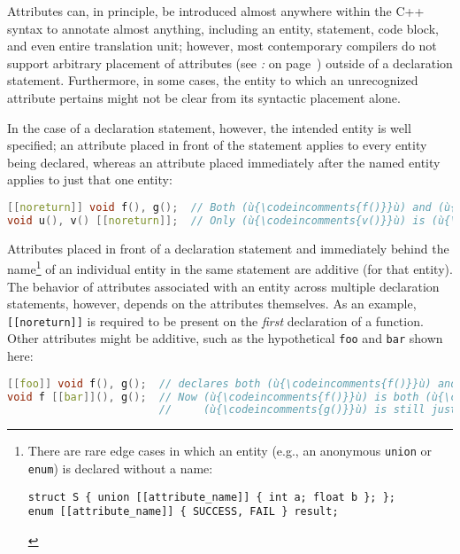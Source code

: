 Attributes can, in principle, be introduced almost anywhere within the
C++ syntax to annotate almost anything, including an entity,
statement, code block, and even entire translation
unit; however, most contemporary compilers do not support arbitrary
placement of attributes (see {\it{}:} {\it{}} on page~\pageref{probing-where-attributes-are-permitted-in-the-compiler’s-c++-grammar}) outside of a
declaration statement. Furthermore, in some cases, the entity to
which an unrecognized attribute pertains might not be clear from its
syntactic placement alone.

In the case of a declaration statement, however, the intended entity is
well specified; an attribute placed in front of the statement applies to
every entity being declared, whereas an attribute placed immediately
after the named entity applies to just that one entity:

\begin{lstlisting}[language=C++]
[[noreturn]] void f(), g();  // Both (ù{\codeincomments{f()}}ù) and (ù{\codeincomments{g()}}ù) are (ù{\codeincomments{noreturn}}ù).
void u(), v() [[noreturn]];  // Only (ù{\codeincomments{v()}}ù) is (ù{\codeincomments{noreturn}}ù).
\end{lstlisting}

\noindent Attributes placed in front of a declaration statement and immediately
behind the name{\cprotect\footnote{There are rare edge cases in which an
entity (e.g., an anonymous \texttt{union} or \texttt{enum}) is
declared without a name:

\begin{lstlisting}[style=footcode]
struct S { union [[attribute_name]] { int a; float b }; };
enum [[attribute_name]] { SUCCESS, FAIL } result;
\end{lstlisting} \vspace*{-1ex}
      }} of an individual entity in the same statement are additive (for
that entity). The behavior of attributes associated with an entity
across multiple declaration statements, however, depends on the
attributes themselves. As an example, \texttt{[[noreturn]]} is required
to be present on the \emph{first} declaration of a function. Other
attributes might be additive, such as the hypothetical \texttt{foo} and
\texttt{bar} shown here:

\begin{lstlisting}[language=C++]
[[foo]] void f(), g();  // declares both (ù{\codeincomments{f()}}ù) and (ù{\codeincomments{g()}}ù) to be (ù{\codeincomments{foo}}ù)
void f [[bar]](), g();  // Now (ù{\codeincomments{f()}}ù) is both (ù{\codeincomments{foo}}ù) and (ù{\codeincomments{bar}}ù) while
                        //     (ù{\codeincomments{g()}}ù) is still just (ù{\codeincomments{foo}}ù).
\end{lstlisting}
\pagebreak%

